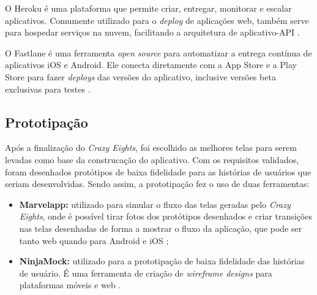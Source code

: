 O Heroku é uma plataforma que permite criar, entregar, monitorar e escalar aplicativos. Comumente utilizado para o \textit{deploy} de aplicações web, também serve para hospedar serviços na nuvem, facilitando a arquitetura de aplicativo-API \cite{heroku}.

O Fastlane é uma ferramenta \textit{open source} para automatizar a entrega contínua de aplicativos iOS e Android. Ele conecta diretamente com a App Store e a Play Store para fazer \textit{deploys} das versões do aplicativo, inclusive versões beta exclusivas para testes \cite{fastlane}.

\subsection{Prototipação}

Após a finalização do \textit{Crazy Eights}, foi escolhido as melhores telas para serem levadas como base da construcação do aplicativo. Com os requisitos validados, foram desenhados protótipos de baixa fidelidade para as histórias de usuários que seriam desenvolvidas. Sendo assim, a prototipação fez o uso de duas ferramentas:

\begin{itemize}
    \setlength\itemsep{0em}
    \item \textbf{Marvelapp:} utilizado para simular o fluxo das telas geradas pelo \textit{Crazy Eights}, onde é possível tirar fotos dos protótipos desenhados e criar transições nas telas desenhadas de forma a mostrar o fluxo da aplicação, que pode ser tanto web quando para Android e iOS \cite{marvelapp};
    \item \textbf{NinjaMock:} utilizado para a prototipação de baixa fidelidade das histórias de usuário. É uma ferramenta de criação de \textit{wireframe designs} para plataformas móveis e web \cite{ninjamock}.
\end{itemize}

